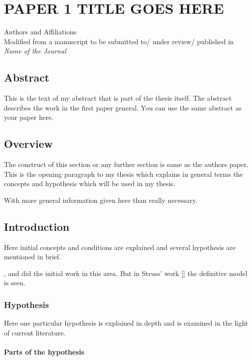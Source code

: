 \documentclass[
]{article}
\author{}
\date{\vspace{-2.5em}}
\begin{document}
\chapter{PAPER 1 TITLE GOES HERE}

\label{polymer_fibers}

\begin{center}
    Authors and Affiliations \\
    Modified from a manuscript to be submitted to/ under review/ published in \textit{Name of the Journal} 
\end{center}

\section{Abstract}

This is the text of my abstract that is part of the thesis itself. The
abstract describes the work in the first paper general. You can use the
same abstract as your paper here.

\section{Overview}

The construct of this section or any further section is same as the
authors paper. This is the opening paragraph to my thesis which explains
in general terms the concepts and hypothesis which will be used in my
thesis.

With more general information given here than really necessary.

\section{Introduction}

Here initial concepts and conditions are explained and several
hypothesis are mentioned in brief.

\cite{allen}, \cite{bruner} and \cite{cox} did the initial work in this
area. But in Struss' work {[}\cite{struss}{]} the definitive model is
seen.

\subsection{Hypothesis}

Here one particular hypothesis is explained in depth and is examined in
the light of current literature.

\subsubsection{Parts of the hypothesis}
\end{document}

